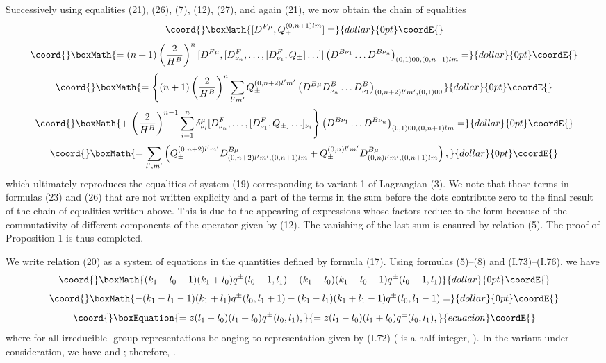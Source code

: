 \documentclass[a4paper,12pt]{article}
\begin{document}
Successively using equalities (21), (26), (7), (12), (27), and again (21), we
now obtain the chain of equalities
$$\coord{}\boxMath{[D^{F \mu}, Q^{(0,n+1)lm}_{\pm}] =}{dollar}{0pt}\coordE{}$$  $$\coord{}\boxMath{= (n+1) \left( \frac{2}{H^{B}} \right)^{n}
[D^{F \mu},[D^{F}_{\nu_{n}}, \ldots, [D^{F}_{\nu_{1}},Q_{\pm}]\ldots ]]\left( 
D^{B\nu_{1}}\ldots D^{B\nu_{n}} \right)_{(0,1)00,(0,n+1)lm} =}{dollar}{0pt}\coordE{}$$  $$\coord{}\boxMath{= \left\{ (n+1)\left( \frac{2}{H^{B}} \right)^{n} \sum_{l'm'} 
Q^{(0,n+2)l'm'}_{\pm} \left( D^{B \mu} D^{B}_{\nu_{n}} \ldots  D^{B}_{\nu_{1}}
\right)_{(0,n+2)l'm',(0,1)00} \right.}{dollar}{0pt}\coordE{}$$  $$\coord{}\boxMath{+ \left. \left( \frac{2}{H^{B}} \right)^{n-1}
\sum_{i=1}^{n} \delta^{\mu}_{\nu_{i}}
[D^{F}_{\nu_{n}}, \ldots, [ D^{F}_{\nu_{1}},Q_{\pm}]\ldots ]_{\nu_{i}}\right\}
\left( D^{B\nu_{1}}\ldots D^{B\nu_{n}} \right)_{(0,1)00,(0,n+1)lm} =}{dollar}{0pt}\coordE{}$$  $$\coord{}\boxMath{= \sum_{l',m'} \left( Q^{(0,n+2)l'm'}_{\pm} D^{B \mu}_{(0,n+2)l'm',(0,n+1)lm}
+ Q^{(0,n)l'm'}_{\pm} D^{B \mu}_{(0,n)l'm',(0,n+1)lm} \right),}{dollar}{0pt}\coordE{}$$
which ultimately reproduces the equalities of system (19) corresponding to
variant 1 of Lagrangian (3). We note that those terms in formulas (23) and (26)
that are not written explicity and a part of the terms in the sum before the
dots contribute zero to the final result of the chain of equalities written
above. This is due to the appearing of expressions \coordHE{} whose factors reduce to
the form \coordHE{} 
\coordHE{} because of the commutativity of 
different components of the operator \coordHE{} given by (12). The vanishing of
the last sum is ensured by relation (5). The proof of Proposition 1 is thus 
completed.

We write relation (20) as a system of equations in the quantities 
\coordHE{} defined by formula (17). Using formulas (5)--(8) and
(I.73)--(I.76), we have
$$\coord{}\boxMath{(k_{1}-l_{0}-1)(k_{1}+l_{0})q^{\pm}(l_{0}+1,l_{1})
+ (k_{1}-l_{0})(k_{1}+l_{0}-1)q^{\pm}(l_{0}-1,l_{1})}{dollar}{0pt}\coordE{}$$  $$\coord{}\boxMath{- (k_{1}-l_{1}-1)(k_{1}+l_{1})q^{\pm}(l_{0},l_{1}+1)
- (k_{1}-l_{1})(k_{1}+l_{1}-1)q^{\pm}(l_{0},l_{1}-1) =}{dollar}{0pt}\coordE{}$$
\begin{equation}\coord{}\boxEquation{
= z(l_{1}-l_{0})(l_{1}+l_{0})q^{\pm}(l_{0},l_{1}),
}{
= z(l_{1}-l_{0})(l_{1}+l_{0})q^{\pm}(l_{0},l_{1}),
}{ecuacion}\coordE{}\end{equation}
where \coordHE{} for all irreducible \coordHE{}-group 
representations \coordHE{} belonging to representation \coordHE{} given 
by (I.72) (\coordHE{} is a half-integer, \coordHE{}). In the variant under
consideration, we have \coordHE{} and \coordHE{}; therefore, 
\coordHE{}.
\end{document}
